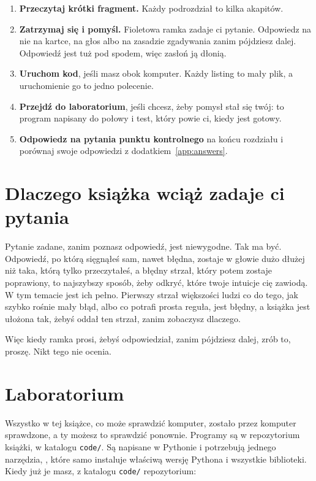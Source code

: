 \begin{enumerate}[leftmargin=1.6em, itemsep=3pt]
  \item \textbf{Przeczytaj krótki fragment.} Każdy podrozdział to kilka
        akapitów.
  \item \textbf{Zatrzymaj się i pomyśl.} Fioletowa ramka zadaje ci pytanie.
        Odpowiedz na nie \dash{} na kartce, na głos albo na zasadzie
        zgadywania \dash{} zanim pójdziesz dalej. Odpowiedź jest tuż pod
        spodem, więc zasłoń ją dłonią.
  \item \textbf{Uruchom kod}, jeśli masz obok komputer. Każdy listing to
        mały plik, a uruchomienie go to jedno polecenie.
  \item \textbf{Przejdź do laboratorium}, jeśli chcesz, żeby pomysł stał się
        twój: to program napisany do połowy i test, który powie ci, kiedy jest
        gotowy.
  \item \textbf{Odpowiedz na pytania punktu kontrolnego} na końcu rozdziału
        i porównaj swoje odpowiedzi z dodatkiem~\ref{app:answers}.
\end{enumerate}

\section*{Dlaczego książka wciąż zadaje ci pytania}

Pytanie zadane, zanim poznasz odpowiedź, jest niewygodne. Tak ma być.
Odpowiedź, po którą sięgnąłeś sam, nawet błędna, zostaje w głowie dużo
dłużej niż taka, którą tylko przeczytałeś, a błędny strzał, który potem
zostaje poprawiony, to najszybszy sposób, żeby odkryć, które twoje intuicje
cię zawiodą. W tym temacie jest ich pełno. Pierwszy strzał większości ludzi
co do tego, jak szybko rośnie mały błąd, albo co potrafi prosta reguła, jest
błędny, a książka jest ułożona tak, żebyś oddał ten strzał, zanim zobaczysz
dlaczego.

Więc kiedy ramka prosi, żebyś odpowiedział, zanim pójdziesz dalej, zrób to,
proszę. Nikt tego nie ocenia.

\section*{Laboratorium}

Wszystko w tej książce, co może sprawdzić komputer, zostało przez komputer
sprawdzone, a ty możesz to sprawdzić ponownie. Programy są w repozytorium
książki, w katalogu \texttt{code/}. Są napisane w Pythonie i potrzebują
jednego narzędzia, , które samo instaluje właściwą wersję Pythona i
wszystkie biblioteki. Kiedy już je masz, z katalogu \texttt{code/}
repozytorium:

